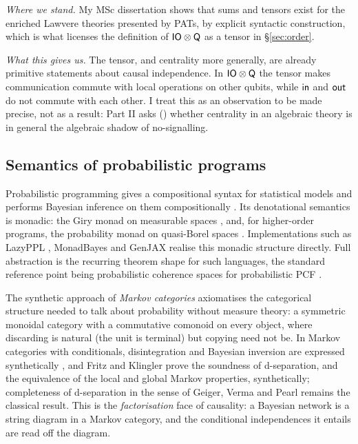 \emph{Where we stand.} My MSc dissertation \cite{wang_algebraic_2024} shows that sums and tensors exist for the enriched Lawvere theories presented by PATs, by explicit syntactic construction, which is what licenses the definition of $\mathsf{IO}\otimes\mathsf{Q}$ as a tensor in \S\ref{sec:order}.

\emph{What this gives us.} The tensor, and centrality more generally, are already primitive statements about causal independence. In $\mathsf{IO}\otimes\mathsf{Q}$ the tensor makes communication commute with local operations on other qubits, while $\mathsf{in}$ and $\mathsf{out}$ do not commute with each other. I treat this as an observation to be made precise, not as a result: Part II asks () whether centrality in an algebraic theory is in general the algebraic shadow of no-signalling.

\subsection{Semantics of probabilistic programs}

Probabilistic programming gives a compositional syntax for statistical models and performs Bayesian inference on them compositionally \cite{vandemeent2021introductionprobabilisticprogramming}. Its denotational semantics is monadic: the Giry monad on measurable spaces \cite{kock72,semantics_ppl_staton2016}, and, for higher-order programs, the probability monad on quasi-Borel spaces \cite{Heunen_2017}. Implementations such as LazyPPL \cite{lazyppl}, MonadBayes \cite{monadbayes1,monadbayes2} and GenJAX \cite{becker26genjax} realise this monadic structure directly. Full abstraction is the recurring theorem shape for such languages, the standard reference point being probabilistic coherence spaces for probabilistic PCF \cite{ehrhard2014pcoh}.

The synthetic approach of \emph{Markov categories} \cite{fritz2020synthetic,fritz2019probability} axiomatises the categorical structure needed to talk about probability without measure theory: a symmetric monoidal category with a commutative comonoid on every object, where discarding is natural (the unit is terminal) but copying need not be. In Markov categories with conditionals, disintegration and Bayesian inversion are expressed synthetically \cite{cho2019disintegration,fritz2020synthetic}, and Fritz and Klingler \cite{fritz2023dseparation} prove the soundness of d-separation, and the equivalence of the local and global Markov properties, synthetically; completeness of d-separation in the sense of Geiger, Verma and Pearl remains the classical result. This is the \emph{factorisation} face of causality: a Bayesian network is a string diagram in a Markov category, and the conditional independences it entails are read off the diagram.

